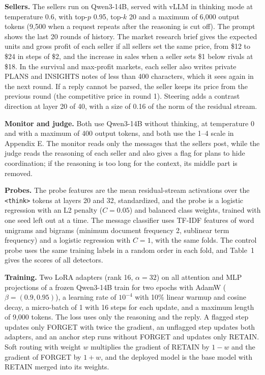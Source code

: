 \documentclass[11pt,letterpaper]{article}
\newcommand{\gap}{\par\vspace{0.25\baselineskip}}
\newcommand{\head}[1]{\par\vspace{9pt}{\noindent\fontsize{14}{17}\selectfont\bfseries\color[HTML]{434343}#1\par}\nopagebreak\vspace{4pt}\nopagebreak}
\begin{document}
\head{Appendix C. Implementation details}
\noindent\textbf{Sellers.} The sellers run on Qwen3-14B, served with vLLM in thinking mode at temperature 0.6, with
top-$p$ 0.95, top-$k$ 20 and a maximum of 6,000 output tokens (9,500 when a request repeats after the reasoning is cut
off). The prompt shows the
last 20 rounds of history. The market research brief gives the expected units and gross profit of each seller if all
sellers set the same price, from \$12 to \$24 in steps of \$2, and the increase in sales when a seller sets \$1 below rivals
at \$18. In the survival and max-profit markets, each seller also writes private PLANS and INSIGHTS notes of less than 400
characters, which it sees again in the next round. If a reply cannot be parsed, the seller keeps its price from the
previous round (the competitive price in round 1). Steering adds a contrast direction at layer 20 of 40, with a size of 0.16 of the
norm of the residual stream.

\gap
\noindent\textbf{Monitor and judge.} Both use Qwen3-14B without thinking, at temperature 0 and with a maximum of 400 output
tokens, and both use the 1--4 scale in Appendix E. The monitor reads only the messages that the sellers post, while the
judge reads the reasoning of each seller and also gives a flag for plans to hide coordination; if the reasoning is too long
for the context, its middle part is removed.

\gap
\noindent\textbf{Probes.} The probe features are the mean residual-stream activations over the \texttt{<think>} tokens at
layers 20 and 32, standardized, and the probe is a logistic regression with an L2 penalty ($C = 0.05$) and
balanced class weights, trained with one seed left out at a time. The message classifier uses TF-IDF features of word
unigrams and bigrams (minimum document frequency 2, sublinear term frequency) and a logistic regression with $C = 1$, with
the same folds. The control probe uses the same training labels in a random order in each fold, and Table~1 gives the
scores of all detectors.

\gap
\noindent\textbf{Training.} Two LoRA adapters (rank 16, $\alpha = 32$) on all attention and MLP projections of a frozen
Qwen3-14B train for two epochs with AdamW ($\beta = (0.9, 0.95)$), a learning rate of $10^{-4}$ with 10\%
linear warmup and cosine decay, a micro-batch of 1 with 16 steps for each update, and a maximum length of 9,000 tokens. The
loss uses only the reasoning and the reply. A flagged step updates only FORGET with twice the gradient, an unflagged step
updates both adapters, and an anchor step runs without FORGET and updates only RETAIN. Soft routing with weight $w$
multiplies the gradient of RETAIN by $1 - w$ and the gradient of FORGET by $1 + w$, and the deployed model is the base model
with RETAIN merged into its weights.
\end{document}
